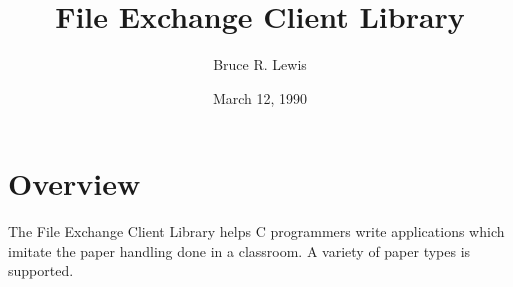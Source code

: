

\title{File Exchange Client Library}
\author{Bruce R. Lewis}
\date{March 12, 1990}

\addtolength{\oddsidemargin}{-.5in}
\addtolength{\evensidemargin}{-.5in}
\addtolength{\textwidth}{1in}


\maketitle
\tableofcontents
\newpage

\section{Overview}

The File Exchange Client Library helps C programmers write
applications which imitate the paper handling done in a classroom.  A
variety of paper types is supported.

